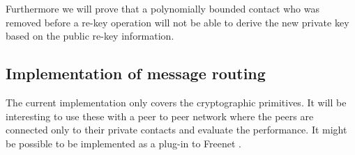 Furthermore we will prove that a polynomially bounded contact who was removed before a re-key operation will not be able to derive the new private key based on the public re-key information.

\subsection{Implementation of message routing}
The current implementation only covers the cryptographic primitives. It will be interesting to use these with a peer to peer network where the peers are connected only to their private contacts and evaluate the performance. It might be possible to be implemented as a plug-in to Freenet \cite{freenet}.

